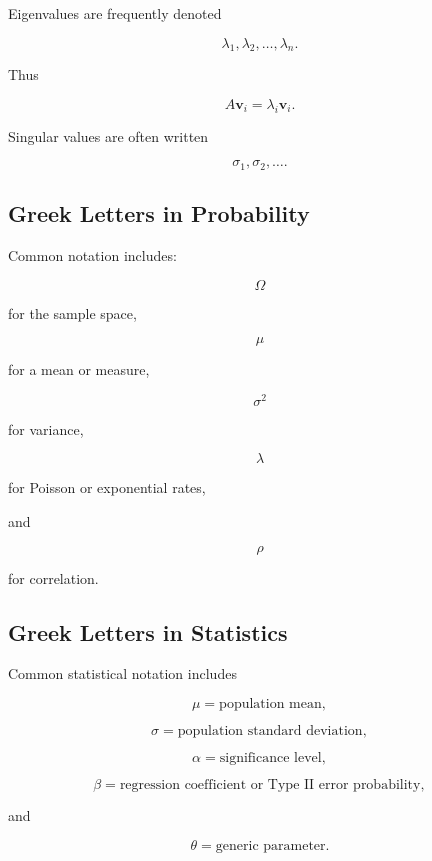 Eigenvalues are frequently denoted

\[
\boxed{
\lambda_1,
\lambda_2,
\ldots,
\lambda_n.
}
\]

Thus

\[
\boxed{
A\mathbf{v}_i
=
\lambda_i\mathbf{v}_i.
}
\]

Singular values are often written

\[
\boxed{
\sigma_1,
\sigma_2,
\ldots.
}
\]

\subsection{Greek Letters in Probability}
\label{subsec:greek-probability-uses}

Common notation includes:

\[
\boxed{
\Omega
}
\]

for the sample space,

\[
\boxed{
\mu
}
\]

for a mean or measure,

\[
\boxed{
\sigma^2
}
\]

for variance,

\[
\boxed{
\lambda
}
\]

for Poisson or exponential rates,

and

\[
\boxed{
\rho
}
\]

for correlation.

\subsection{Greek Letters in Statistics}
\label{subsec:greek-statistics-uses}

Common statistical notation includes

\[
\boxed{
\mu
=
\text{population mean},
}
\]

\[
\boxed{
\sigma
=
\text{population standard deviation},
}
\]

\[
\boxed{
\alpha
=
\text{significance level},
}
\]

\[
\boxed{
\beta
=
\text{regression coefficient or Type II error probability},
}
\]

and

\[
\boxed{
\theta
=
\text{generic parameter}.
}
\]

